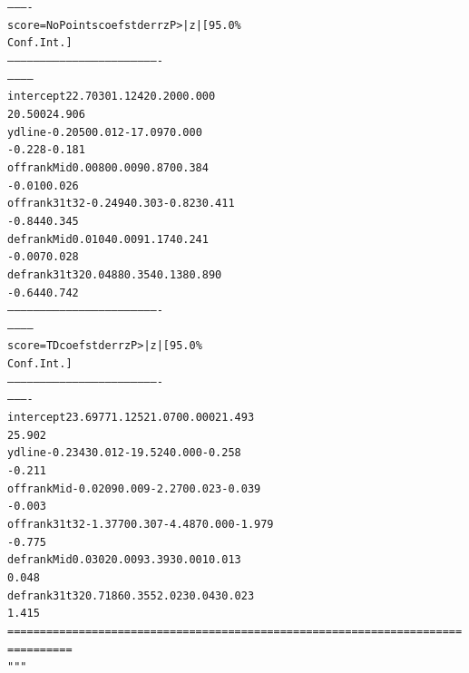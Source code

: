 \documentclass[letterpaper,10pt,english]{/anaconda/lib/python2.7/site-packages/sphinx/texinputs/sphinxhowto}
\newenvironment{InvisibleVerbatim}
        {\begin{mdframed}[leftmargin=0.1\linewidth,innerleftmargin=3pt,innerrightmargin=3pt, userdefinedwidth=1\linewidth, linewidth=0pt, linecolor=white, usetwoside=false]}
        {\end{mdframed}}
\begin{document}
\begin{InvisibleVerbatim}
\begin{alltt}
----------
score=NoPoints       coef    std err          z      P>|z|      [95.0\%
Conf. Int.]
----------------------------------------------------------------------
------------
intercept         22.7030      1.124     20.200      0.000
20.500    24.906
ydline            -0.2050      0.012    -17.097      0.000
-0.228    -0.181
offrankMid         0.0080      0.009      0.870      0.384
-0.010     0.026
offrank31t32      -0.2494      0.303     -0.823      0.411
-0.844     0.345
defrankMid         0.0104      0.009      1.174      0.241
-0.007     0.028
defrank31t32       0.0488      0.354      0.138      0.890
-0.644     0.742
----------------------------------------------------------------------
------------
    score=TD       coef    std err          z      P>|z|      [95.0\%
Conf. Int.]
----------------------------------------------------------------------
----------
intercept       23.6977      1.125     21.070      0.000        21.493
25.902
ydline          -0.2343      0.012    -19.524      0.000        -0.258
-0.211
offrankMid      -0.0209      0.009     -2.270      0.023        -0.039
-0.003
offrank31t32    -1.3770      0.307     -4.487      0.000        -1.979
-0.775
defrankMid       0.0302      0.009      3.393      0.001         0.013
0.048
defrank31t32     0.7186      0.355      2.023      0.043         0.023
1.415
======================================================================
==========
"""\end{alltt}

            \end{InvisibleVerbatim}
            
        
    


    

        
        

            
\end{document}
